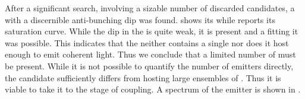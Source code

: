 				After a significant search, involving a sizable number of discarded candidates, a \nd with a discernible anti-bunching dip was found.  shows its \gtf while  reports its saturation curve. While the dip in the \gtf is quite weak, it is present and a fitting it was possible. This indicates that the \nd neither contains a single \siv nor does it host enough \sivs to emit coherent light. Thus we conclude that a limited number of \sivs must be present. While it is not possible to quantify the number of emitters directly, the candidate sufficiently differs from \nds hosting large ensembles of \sivs. Thus it is viable to take it to the stage of coupling. A \pl spectrum of the emitter is shown in .

